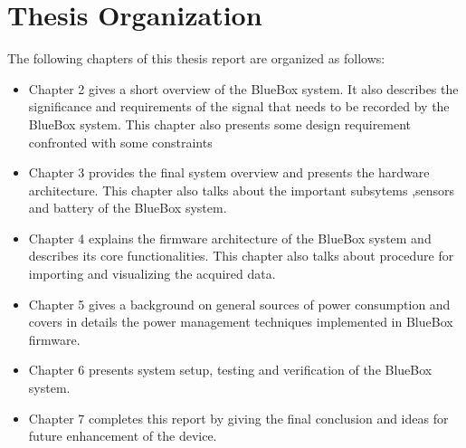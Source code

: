 \section{Thesis Organization}
The following chapters of this thesis report are organized as follows:
\begin{itemize}
	\item Chapter 2 gives a short overview of the BlueBox system. It also describes the significance and  requirements of the signal that needs to be recorded by the BlueBox system. This chapter also presents some design requirement confronted with some constraints
	
	\item Chapter 3 provides the final system overview and presents the hardware architecture. This chapter also talks about the important subsytems ,sensors and battery of the BlueBox system.
	
	\item  Chapter 4 explains the firmware architecture of the BlueBox system and describes its core functionalities. This chapter also talks about procedure for importing and visualizing the acquired data.
	
	\item Chapter 5 gives a background on general sources of power consumption and covers in details the power management techniques implemented in BlueBox firmware.
	
	\item Chapter 6 presents system setup, testing and verification of the BlueBox system. 
	
	\item
	Chapter 7 completes this report by giving the final conclusion and ideas for future enhancement of the device.
	
\end{itemize}
